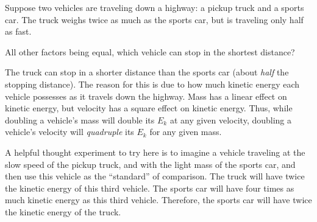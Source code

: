 

Suppose two vehicles are traveling down a highway: a pickup truck and a sports car.  The truck weighs twice as much as the sports car, but is traveling only half as fast.

\vskip 10pt

All other factors being equal, which vehicle can stop in the shortest distance?







The truck can stop in a shorter distance than the sports car (about {\it half} the stopping distance).  The reason for this is due to how much kinetic energy each vehicle possesses as it travels down the highway.  Mass has a linear effect on kinetic energy, but velocity has a square effect on kinetic energy.  Thus, while doubling a vehicle's mass will double its $E_k$ at any given velocity, doubling a vehicle's velocity will {\it quadruple} its $E_k$ for any given mass.  

\vskip 10pt

A helpful thought experiment to try here is to imagine a vehicle traveling at the slow speed of the pickup truck, and with the light mass of the sports car, and then use this vehicle as the ``standard'' of comparison.  The truck will have twice the kinetic energy of this third vehicle.  The sports car will have four times as much kinetic energy as this third vehicle.  Therefore, the sports car will have twice the kinetic energy of the truck.











